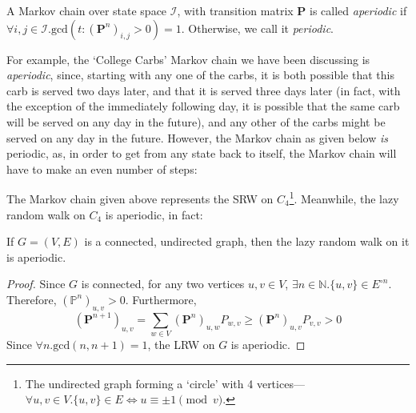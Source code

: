 			\begin{definition}[Periodicity]
				A Markov chain over state space $\mathcal{I}$, with transition matrix 
				$\mathbf{P}$ is called \emph{aperiodic} if $\forall i,j\in \mathcal{I}. 
				\mathrm{gcd}(t : (\mathbf{P}^n)_{i,j} > 0) = 1$. Otherwise, we call it 
				\emph{periodic}.
			\end{definition}
			For example, the `College Carbs' Markov chain we have been discussing is 
			\emph{aperiodic}, since, starting with any one of the carbs, it is both possible that
			this carb is served two days later, and that it is served three days later (in fact, 
			with the exception of the immediately following day, it is possible that the same carb
			will be served on any day in the future), and any other of the carbs might be served on 
			any day in the future. However, the Markov chain as given below \emph{is} periodic,
			as, in order to get from any state back to itself, the Markov chain will have to 
			make an even number of steps:
			\begin{center}
			\end{center}

			The Markov chain given above represents the SRW on $C_4$\footnote{The undirected graph 
			forming a `circle' with 4 vertices---$\forall u,v \in V. \{u,v\} \in E \iff u \equiv
			\pm 1 \pmod v$.}. Meanwhile, the lazy random walk on $C_4$ is aperiodic, in fact:
			\begin{lemma}
				If $G = (V, E)$ is a connected, undirected graph, then the lazy random walk on
				it is aperiodic.
			\end{lemma}
			\begin{proof}
				Since $G$ is connected, for any two vertices $u,v \in V$, $\exists n \in 
				\mathbb{N}. \{u, v\} \in E^{\circ n}$. Therefore, $(\mathbb{P}^n)_{u,v} > 0$. 
				Furthermore, 
				$$
					(\mathbf{P}^{n+1})_{u,v} = \sum_{w \in V} (\mathbf{P}^n)_{u, w} P_{w,v}
					\geq (\mathbf{P}^n)_{u,v} P_{v,v} > 0
				$$
				Since $\forall n. \mathrm{gcd}(n, n+1) = 1$, the LRW on $G$ is aperiodic.
			\end{proof}


